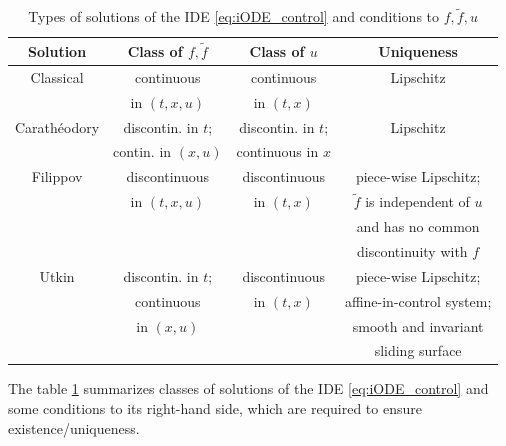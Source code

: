 \documentclass{article}
\begin{document}
\begin{table}[b]
	\centering
		\caption{Types of solutions of the IDE \eqref{eq:iODE_control} and conditions to $f,\tilde f,u$}
	\begin{tabular}{c|c|c|c}
		\textbf{Solution} & \!\!\textbf{Class of $f,\tilde f$}\!\! & \textbf{Class of $u$} & \textbf{Uniqueness}\\ 
		\hline
		Classical    & continuous &  continuous& Lipschitz\\
		\cite{Lakshmikantham_etal1995:Book}& in $(t,x,u)$ & in $(t,x)$ &  \\
		\hline
		\!\!\!Carath\'eodory\!\!
		& \!\!discontin. in $t$;\!\! & \!\!discontin. in $t$;\!\!&    Lipschitz\\
		\cite{OReganMeehan1998:Book}  & \!\!contin. in $(x,u)$\!\!  & \!\!continuous in $x$\!\! &  \\
		\hline
		Filippov & \!\!discontinuous\!\! & discontinuous & piece-wise Lipschitz;\\
		 & in $(t,x,u)$ & in $(t,x)$ & \!$\tilde f$ is independent of $u$\\
		&&& \!\! and has no common \\
		& & & discontinuity  with $f$\\
		\hline
		Utkin & \!\!discontin. in $t$;\!\!& discontinuous & piece-wise Lipschitz;  \\
		& continuous&  in $(t,x)$ &  \!\!affine-in-control system;\!\!\!\\
		& in $(x,u)$&&\!smooth {and invariant}  \\
		& & & sliding surface
	\end{tabular}
	\label{tab:sol_IDE}
	\vspace{-3mm}
\end{table}

The table \ref{tab:sol_IDE} summarizes 
classes of solutions of the IDE \eqref{eq:iODE_control} and some conditions to its right-hand side, which are required to ensure existence/uniqueness.
\end{document}
